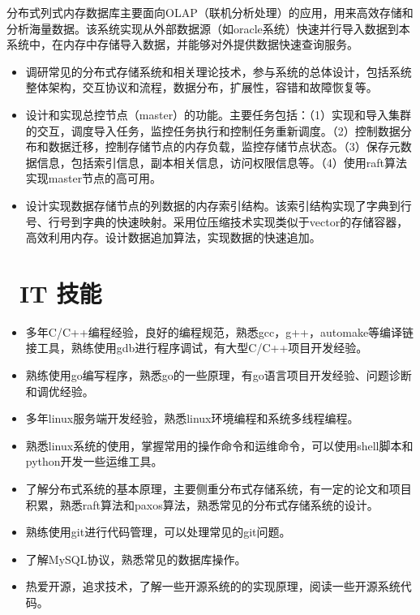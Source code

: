 \documentclass{resume}
\begin{document}
分布式列式内存数据库主要面向OLAP（联机分析处理）的应用，用来高效存储和分析海量数据。该系统实现从外部数据源（如oracle系统）快速并行导入数据到本系统中，在内存中存储导入数据，并能够对外提供数据快速查询服务。
\begin{itemize}
  \item 调研常见的分布式存储系统和相关理论技术，参与系统的总体设计，包括系统整体架构，交互协议和流程，数据分布，扩展性，容错和故障恢复等。
  \item 设计和实现总控节点（master）的功能。主要任务包括：（1）实现和导入集群的交互，调度导入任务，监控任务执行和控制任务重新调度。（2）控制数据分布和数据迁移，控制存储节点的内存负载，监控存储节点状态。（3）保存元数据信息，包括索引信息，副本相关信息，访问权限信息等。（4）使用raft算法实现master节点的高可用。
  \item 设计实现数据存储节点的列数据的内存索引结构。该索引结构实现了字典到行号、行号到字典的快速映射。采用位压缩技术实现类似于vector的存储容器，高效利用内存。设计数据追加算法，实现数据的快速追加。
\end{itemize}


\section{\faCogs\ IT 技能}
\begin{itemize}[parsep=0.5ex]
  \item 多年C/C++编程经验，良好的编程规范，熟悉gcc，g++，automake等编译链接工具，熟练使用gdb进行程序调试，有大型C/C++项目开发经验。
  \item 熟练使用go编写程序，熟悉go的一些原理，有go语言项目开发经验、问题诊断和调优经验。
  \item 多年linux服务端开发经验，熟悉linux环境编程和系统多线程编程。
  \item 熟悉linux系统的使用，掌握常用的操作命令和运维命令，可以使用shell脚本和python开发一些运维工具。
  \item 了解分布式系统的基本原理，主要侧重分布式存储系统，有一定的论文和项目积累，熟悉raft算法和paxos算法，熟悉常见的分布式存储系统的设计。
  \item 熟练使用git进行代码管理，可以处理常见的git问题。
  \item 了解MySQL协议，熟悉常见的数据库操作。
  \item 热爱开源，追求技术，了解一些开源系统的的实现原理，阅读一些开源系统代码。
\end{itemize}
\end{document}
